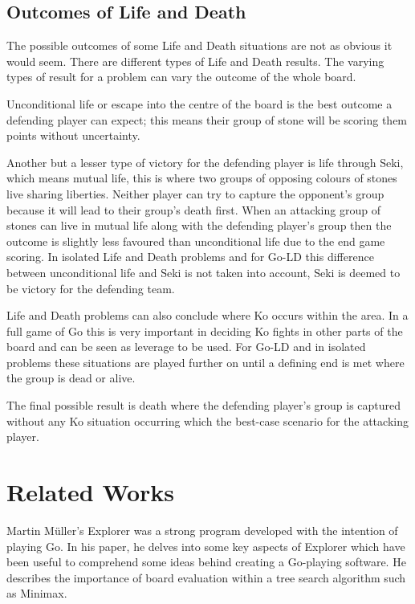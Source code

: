 \documentclass{l4proj}
\begin{document}
\subsection{Outcomes of Life and Death}
The possible outcomes of some Life and Death situations are not as obvious it would seem. There are different types of Life and Death results. The varying types of result for a problem can vary the outcome of the whole board.

Unconditional life or escape into the centre of the board is the best outcome a defending player can expect; this means their group of stone will be scoring them points without uncertainty.

Another but a lesser type of victory for the defending player is life through Seki, which means mutual life, this is where two groups of opposing colours of stones live sharing liberties. Neither player can try to capture the opponent’s group because it will lead to their group’s death first. When an attacking group of stones can live in mutual life along with the defending player’s group then the outcome is slightly less favoured than unconditional life due to the end game scoring. In isolated Life and Death problems and for Go-LD this difference between unconditional life and Seki is not taken into account, Seki is deemed to be victory for the defending team.

Life and Death problems can also conclude where Ko occurs within the area. In a full game of Go this is very important in deciding Ko fights in other parts of the board and can be seen as leverage to be used.  For Go-LD and in isolated problems these situations are played further on until a defining end is met where the group is dead or alive.

The final possible result is death where the defending player’s group is captured without any Ko situation occurring which the best-case scenario for the attacking player.

\section{Related Works}

Martin Müller's Explorer \citep{Muller2002} was a strong program developed with the intention of playing Go. In his paper, he delves into some key aspects of Explorer which have been useful to comprehend some ideas behind creating a Go-playing software. He describes the importance of board evaluation within a tree search algorithm such as Minimax.
\end{document}
